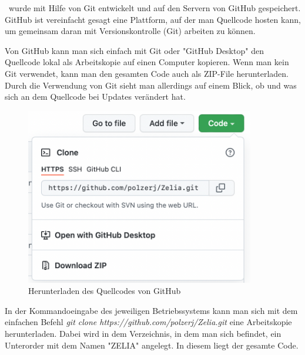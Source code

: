 
\ZELIA\ wurde mit Hilfe von Git entwickelt und auf den Servern von GitHub gespeichert. GitHub ist vereinfacht gesagt eine Plattform, auf der man Quellcode hosten kann, um gemeinsam daran mit Versionskontrolle (Git) arbeiten zu können. 

Von GitHub kann man sich einfach mit Git oder "GitHub Desktop" den Quellcode lokal als Arbeitskopie auf einen Computer kopieren. Wenn man kein Git verwendet, kann man den gesamten Code auch als ZIP-File herunterladen. Durch die Verwendung von Git sieht man allerdings auf einem Blick, ob und was sich an dem Quellcode bei Updates verändert hat.

\begin{figure}[H]
    \centering
    \includegraphics[width=100mm]{media/Handbuch/GitHub_Download.png}
    \caption{Herunterladen des Quellcodes von GitHub}
\end{figure}


In der Kommandoeingabe des jeweiligen Betriebssystems kann man sich mit dem einfachen Befehl \emph{git clone https://github.com/polzerj/Zelia.git} eine Arbeitskopie herunterladen. Dabei wird in dem Verzeichnis, in dem man sich befindet, ein Unterorder mit dem Namen "ZELIA" angelegt. In diesem liegt der gesamte Code.

